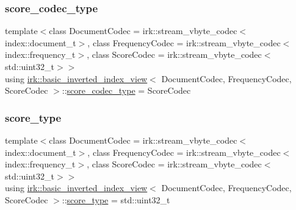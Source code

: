 \mbox{\label{classirk_1_1basic__inverted__index__view_a1ab4b8054127c66df13fc39d22d316ad}} 
\subsubsection{\texorpdfstring{score\+\_\+codec\+\_\+type}{score\_codec\_type}}
{\footnotesize\ttfamily template$<$class Document\+Codec  = irk\+::stream\+\_\+vbyte\+\_\+codec$<$index\+::document\+\_\+t$>$, class Frequency\+Codec  = irk\+::stream\+\_\+vbyte\+\_\+codec$<$index\+::frequency\+\_\+t$>$, class Score\+Codec  = irk\+::stream\+\_\+vbyte\+\_\+codec$<$std\+::uint32\+\_\+t$>$$>$ \\
using \mbox{\hyperlink{classirk_1_1basic__inverted__index__view}{irk\+::basic\+\_\+inverted\+\_\+index\+\_\+view}}$<$ Document\+Codec, Frequency\+Codec, Score\+Codec $>$\+::\mbox{\hyperlink{classirk_1_1basic__inverted__index__view_a1ab4b8054127c66df13fc39d22d316ad}{score\+\_\+codec\+\_\+type}} =  Score\+Codec}

\mbox{\label{classirk_1_1basic__inverted__index__view_a4ce80db3851ca86612fa854329c45142}} 
\subsubsection{\texorpdfstring{score\+\_\+type}{score\_type}}
{\footnotesize\ttfamily template$<$class Document\+Codec  = irk\+::stream\+\_\+vbyte\+\_\+codec$<$index\+::document\+\_\+t$>$, class Frequency\+Codec  = irk\+::stream\+\_\+vbyte\+\_\+codec$<$index\+::frequency\+\_\+t$>$, class Score\+Codec  = irk\+::stream\+\_\+vbyte\+\_\+codec$<$std\+::uint32\+\_\+t$>$$>$ \\
using \mbox{\hyperlink{classirk_1_1basic__inverted__index__view}{irk\+::basic\+\_\+inverted\+\_\+index\+\_\+view}}$<$ Document\+Codec, Frequency\+Codec, Score\+Codec $>$\+::\mbox{\hyperlink{classirk_1_1basic__inverted__index__view_a4ce80db3851ca86612fa854329c45142}{score\+\_\+type}} =  std\+::uint32\+\_\+t}

